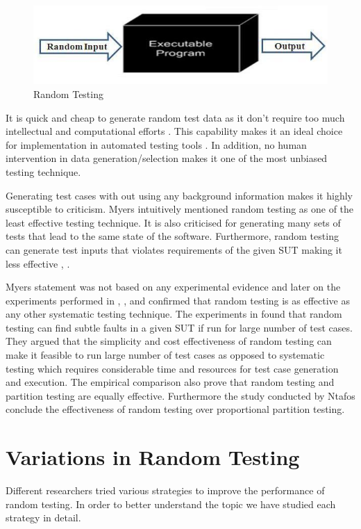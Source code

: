 \begin{figure}[h]
	\centering
	\includegraphics[scale=0.5]{Literature/figure1.jpg}
	\caption{Random Testing}
\end{figure}

It is quick and cheap to generate random test data as it don't require too much intellectual and computational efforts \cite{Ciupa2009}. This capability makes it an ideal choice for implementation in automated testing tools \cite{Ciupa2008a}. In addition, no human intervention in data generation/selection makes it one of the most unbiased testing technique. 

Generating test cases with out using any background information makes it highly susceptible to criticism. Myers \cite{Myers1979} intuitively mentioned random testing as one of the least effective testing technique. It is also criticised for generating many sets of tests that lead to the same state of the software. Furthermore, random testing can generate test inputs that violates requirements of the given SUT making it less effective \cite{sen2007effective}, \cite{pacheco2009directed}. 

Myers statement was not based on any experimental evidence and later on the experiments performed in \cite{hamlet1994}, \cite{Ciupa2008}, \cite{leitner2007efficient} and \cite{Duran1981} confirmed that random testing is as effective as any other systematic testing technique. The experiments in \cite{Duran1981} found that random testing can find subtle faults in a given SUT if run for large number of test cases. They argued that the simplicity and cost effectiveness of random testing can make it feasible to run large number of test cases as opposed to systematic testing which requires considerable time and resources for test case generation and execution. The empirical comparison \cite{hamlet1990} also prove that random testing and partition testing are equally effective. Furthermore the study conducted by Ntafos \cite{ntafos1998random} conclude the effectiveness of random testing over proportional partition testing.



\section{Variations in Random Testing}
Different researchers tried various strategies to improve the performance of random testing. In order to better understand the topic we have studied each strategy in detail.

